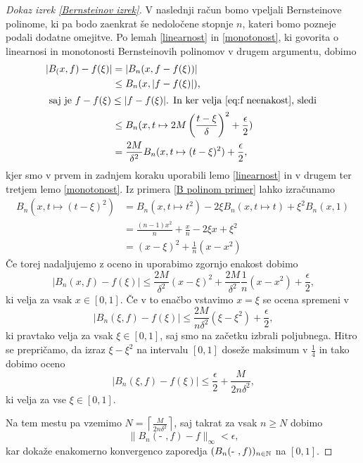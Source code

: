 \documentclass[a4paper, reqno]{amsart}
\theoremstyle{theorem}
\theoremstyle{definition}
\begin{document}
\begin{proof}[Dokaz \emph{izrek \ref{Bernsteinov izrek}}]
V naslednji račun bomo vpeljali Bernsteinove polinome, ki pa bodo zaenkrat še
nedoločene stopnje $n$, kateri bomo pozneje podali dodatne omejitve. Po lemah 
\ref{linearnost} in \ref{monotonost}, ki govorita o linearnosi in monotonosti 
Bernsteinovih polinomov v drugem argumentu, dobimo
\begin{align*}
	|B_(x, f) - f(\xi)| &= |B_n(x, f - f(\xi))|\\
	&\leq B_n(x, |f - f(\xi)|)\text{,}\\
\intertext{
		saj je $f - f(\xi) \leq |f - f(\xi)|$. In ker velja \eqref{eq:f neenakost}, sledi
}
	&\leq B_n(x, t \mapsto 2M\left(\frac{t - \xi}{\delta} \right)^2 + \frac{\epsilon}{2})\\
	&= \frac{2M}{\delta^2}B_n(x, t \mapsto (t - \xi)^2) + \frac{\epsilon}{2}\text{,}
\end{align*}
kjer smo v prvem in zadnjem koraku uporabili lemo \ref{linearnost} in v drugem ter
tretjem lemo \ref{monotonost}. Iz primera \ref{B polinom primer} lahko izračunamo
\begin{align*}
	B_n(x, t \mapsto (t - \xi)^2) &= 
	B_n(x, t \mapsto t^2) - 2\xi B_n(x, t \mapsto t) + \xi^2B_n(x, 1) \\
	&= \frac{(n - 1)x^2}{n} + \frac xn - 2\xi x + \xi^2 \\
	&= (x - \xi)^2 + \frac{1}{n}(x - x^2)
\end{align*}
Če torej nadaljujemo z oceno in uporabimo zgornjo enakost dobimo
$$
|B_n(x, f) - f(\xi)| \leq \frac{2M}{\delta^2}(x - \xi)^2 + 
\frac{2M}{\delta^2}\frac{1}{n}(x - x^2) + \frac{\epsilon}{2}\text{,}
$$
ki velja za vsak $x \in [0,1]$. Če v to enačbo vstavimo $x = \xi$ se ocena spremeni v
$$
|B_n(\xi, f) - f(\xi)| \leq  \frac{2M}{n\delta^2}(\xi - \xi^2) + \frac{\epsilon}{2}\text{,}
$$
ki pravtako velja za vsak $\xi \in [0,1]$, saj smo na začetku izbrali poljubnega. Hitro
se prepričamo, da izraz $\xi - \xi^2$ na intervalu $[0,1]$ doseže maksimum v $\frac{1}{4}$
in tako dobimo oceno
$$
|B_n(\xi, f) - f(\xi)| \leq \frac{\epsilon}{2} + \frac{M}{2n\delta^2}\text{,}
$$ 
ki velja za vse $\xi \in [0,1]$.

\par
Na tem mestu pa vzemimo $N = \left \lceil{\frac{M}{2n\delta^2}}\right \rceil$, saj
takrat za vsak $n \geq N$ dobimo
$$
\|B_n(\text{- }, f) - f\|_{\infty} < \epsilon\text{,}
$$
kar dokaže enakomerno konvergenco zaporedja $(B_n(\text{- },f))_{n \in \mathbb{N}}$ na $[0,1]$.
\end{proof}
\end{document}
